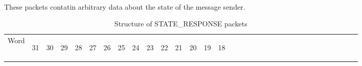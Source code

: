 \documentclass[11pt]{article}
\begin{document}
\paragraph{}
These packets contatin arbitrary data about the state of the message sender.
\newline
\begin{table}[h!]
    \centering
    \label{tab:stateResponseDef}
    \caption{Structure of STATE\_RESPONSE packets}
    \begin{tabular}{|p{1cm}|m{0.04cm}|m{0.04cm}|m{0.04cm}|m{0.04cm}|m{0.04cm}|m{0.04cm}|m{0.04cm}|m{0.04cm}|m{0.04cm}|
        m{0.04cm}|m{0.04cm}|m{0.04cm}|m{0.04cm}|m{0.04cm}|m{0.04cm}|m{0.04cm}|m{0.04cm}|m{0.04cm}|m{0.04cm}|m{0.04cm}|
        m{0.04cm}|m{0.04cm}|m{0.04cm}|m{0.04cm}|m{0.04cm}|m{0.04cm}|m{0.04cm}|m{0.04cm}|m{0.04cm}|m{0.04cm}|m{0.04cm}|m{0.04cm}|}
        \hline
        Word & 
        \begin{sideways}31\end{sideways} &
        \begin{sideways}30\end{sideways} & 
        \begin{sideways}29\end{sideways} &
        \begin{sideways}28\end{sideways} &
        \begin{sideways}27\end{sideways} &
        \begin{sideways}26\end{sideways} &
        \begin{sideways}25\end{sideways} &
        \begin{sideways}24\end{sideways} &
        \begin{sideways}23\end{sideways} &
        \begin{sideways}22\end{sideways} &
        \begin{sideways}21\end{sideways} &
        \begin{sideways}20\end{sideways} &
        \begin{sideways}19\end{sideways} &
        \begin{sideways}18\end{sideways} &

\end{tabular}
\end{table}
\end{document}
